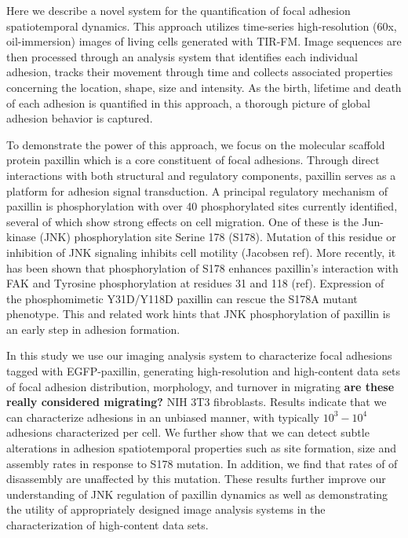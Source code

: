 \documentclass[10pt]{article}
\begin{document}
Here we describe a novel system for the quantification of focal adhesion
spatiotemporal dynamics. This approach utilizes time-series high-resolution
(60x, oil-immersion) images of living cells generated with TIR-FM. Image
sequences are then processed through an analysis system that identifies each
individual adhesion, tracks their movement through time and collects associated
properties concerning the location, shape, size and intensity. As the birth,
lifetime and death of each adhesion is quantified in this approach, a thorough
picture of global adhesion behavior is captured.

To demonstrate the power of this approach, we focus on the molecular scaffold
protein paxillin which is a core constituent of focal adhesions. Through direct
interactions with both structural and regulatory components, paxillin serves as
a platform for adhesion signal transduction. A principal regulatory mechanism of
paxillin is phosphorylation with over 40 phosphorylated sites currently
identified, several of which show strong effects on cell migration. One of these
is the Jun-kinase (JNK) phosphorylation site Serine 178 (S178). Mutation of this
residue or inhibition of JNK signaling inhibits cell motility (Jacobsen ref).
More recently, it has been shown that phosphorylation of S178 enhances
paxillin's interaction with FAK and Tyrosine phosphorylation at residues 31 and
118 (ref). Expression of the phosphomimetic Y31D/Y118D paxillin can rescue the
S178A mutant phenotype. This and related work hints that JNK phosphorylation of
paxillin is an early step in adhesion formation. 

In this study we use our imaging analysis system to characterize focal adhesions
tagged with EGFP-paxillin, generating high-resolution and high-content data sets
of focal adhesion distribution, morphology, and turnover in migrating \textbf{are these really considered migrating?} NIH 3T3
fibroblasts. Results indicate that we can characterize adhesions in an unbiased
manner, with typically $10^3-10^4$ adhesions characterized per cell. We further
show that we can detect subtle alterations in adhesion spatiotemporal properties
such as site formation, size and assembly rates in response to S178 mutation. In
addition, we find that rates of of disassembly are unaffected by this mutation.
These results further improve our understanding of JNK regulation of paxillin
dynamics as well as demonstrating the utility of appropriately designed image
analysis systems in the characterization of high-content data sets.
\end{document}
